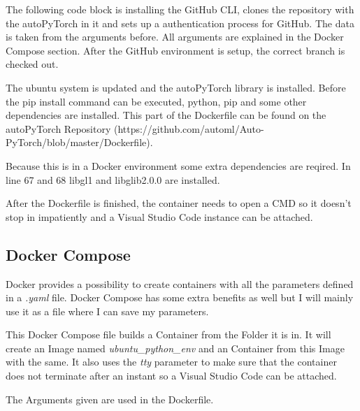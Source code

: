 \documentclass[a4paper, 12pt, oneside]{scrbook}
\begin{document}
		\noindent The following code block is installing the GitHub CLI, clones the repository with the autoPyTorch in it and sets up a authentication process for GitHub. The data is taken from the arguments before. All arguments are explained in the Docker Compose section. After the GitHub environment is setup, the correct branch is checked out. 
		
		\noindent 
		
		\noindent The ubuntu system is updated and the autoPyTorch library is installed. Before the pip install command can be executed, python, pip and some other dependencies are installed. This part of the Dockerfile can be found on the autoPyTorch Repository (https://github.com/automl/Auto-PyTorch/blob/master/Dockerfile). 
		
		\noindent Because this is in a Docker environment some extra dependencies are reqired. In line 67 and 68 libgl1 and libglib2.0.0 are installed. 
		
		\noindent 
		
		\noindent After the Dockerfile is finished, the container needs to open a CMD so it doesn't stop in impatiently and a Visual Studio Code instance can be attached.
		
		\noindent 
		
		\subsection{Docker Compose}
		
		
		Docker provides a possibility to create containers with all the parameters defined in a \textit{.yaml} file. Docker Compose has some extra benefits as well but I will mainly use it as a file where I can save my parameters. 
		
		\noindent This Docker Compose file builds a Container from the Folder it is in. It will create an Image named \textit{ubuntu\_python\_env} and an Container from this Image with the same. It also uses the \textit{tty} parameter to make sure that the container does not terminate after an instant so a Visual Studio Code can be attached. 
		
		\noindent The Arguments given are used in the Dockerfile. 
		
\end{document}
